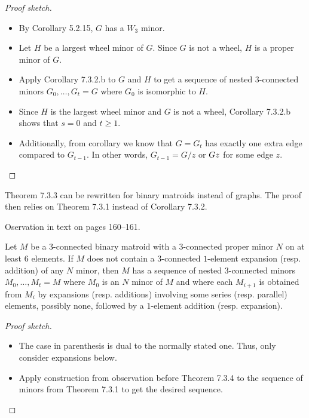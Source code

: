 \begin{proof}[Proof sketch]
  \begin{itemize}
    \item By Corollary 5.2.15, $G$ has a $W_{3}$ minor.
    \item Let $H$ be a largest wheel minor of $G$. Since $G$ is not a wheel, $H$ is a proper minor of $G$.
    \item Apply Corollary 7.3.2.b to $G$ and $H$ to get a sequence of nested $3$-connected minors $G_{0}, \dots, G_{t} = G$ where $G_{0}$ is isomorphic to $H$.
    \item Since $H$ is the largest wheel minor and $G$ is not a wheel, Corollary 7.3.2.b shows that $s = 0$ and $t \geq 1$.
    \item Additionally, from corollary we know that $G = G_{t}$ has exactly one extra edge compared to $G_{t - 1}$. In other words, $G_{t - 1} = G / z$ or $G \\ z$ for some edge $z$.
  \end{itemize}
\end{proof}

\begin{theorem}
  \label{thm:7.3.3.binary}
  Theorem 7.3.3 can be rewritten for binary matroids instead of graphs. The proof then relies on Theorem 7.3.1 instead of Corollary 7.3.2.
\end{theorem}

\begin{proposition}[7.3.4.observation]
  \label{prop:7.3.4.obs}
  Oservation in text on pages 160--161.
\end{proposition}

\begin{theorem}[7.3.4]
  \label{thm:7.3.4}
  Let $M$ be a $3$-connected binary matroid with a $3$-connected proper minor $N$ on at least $6$ elements. If $M$ does not contain a $3$-connected $1$-element expansion (resp. addition) of any $N$ minor, then $M$ has a sequence of nested $3$-connected minors $M_{0}, \dots, M_{t} = M$ where $M_{0}$ is an $N$ minor of $M$ and where each $M_{i + 1}$ is obtained from $M_{i}$ by expansions (resp. additions) involving some series (resp. parallel) elements, possibly none, followed by a $1$-element addition (resp. expansion).
\end{theorem}

\begin{proof}[Proof sketch]
  \begin{itemize}
    \item The case in parenthesis is dual to the normally stated one. Thus, only consider expansions below.
    \item Apply construction from observation before Theorem 7.3.4 to the sequence of minors from Theorem 7.3.1 to get the desired sequence.
  \end{itemize}
\end{proof}

